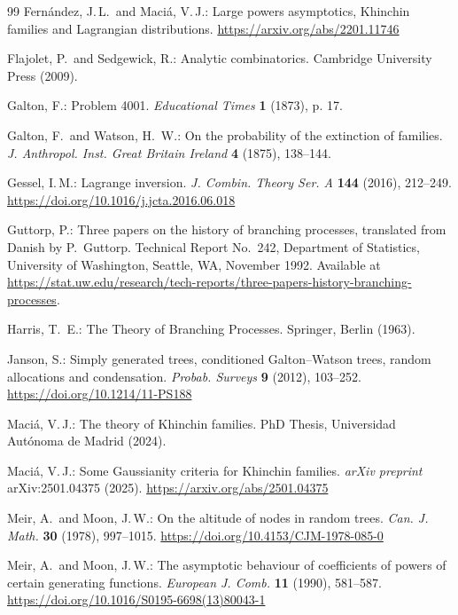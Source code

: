\documentclass[11pt,a4paper,leqno]{amsart}
\theoremstyle{plain}
\theoremstyle{definition}
\numberwithin{equation}{section}
\begin{document}
\begin{thebibliography}{99}
		Fernández, J.\,L.\ and Maciá, V.\,J.: 
		Large powers asymptotics, Khinchin families and Lagrangian distributions.  
		\url{https://arxiv.org/abs/2201.11746}
		
		Flajolet, P.\ and Sedgewick, R.: 
		Analytic combinatorics.  
		Cambridge University Press (2009).
		
		Galton, F.:  
		Problem 4001.  
		\emph{Educational Times} \textbf{1} (1873), p. 17.
		
		Galton, F.\ and Watson, H.~W.: 
		On the probability of the extinction of families.  
		\emph{J. Anthropol. Inst. Great Britain Ireland} \textbf{4} (1875), 138–144.
		
		Gessel, I.\,M.: 
		Lagrange inversion.  
		\emph{J. Combin. Theory Ser. A} \textbf{144} (2016), 212–249.  
		\url{https://doi.org/10.1016/j.jcta.2016.06.018}
		
		Guttorp, P.: 
		Three papers on the history of branching processes, translated from Danish by P.~Guttorp.  
		Technical Report No.~242, Department of Statistics, University of Washington, Seattle, WA, November 1992.  
		Available at \url{https://stat.uw.edu/research/tech-reports/three-papers-history-branching-processes}.  
		
		Harris, T.~E.:  
		The Theory of Branching Processes.  
		Springer, Berlin (1963).  
		
		Janson, S.: 
		Simply generated trees, conditioned Galton–Watson trees, random allocations and condensation.  
		\emph{Probab. Surveys} \textbf{9} (2012), 103–252.  
		\url{https://doi.org/10.1214/11-PS188}
		
		Maciá, V.\,J.: 
		The theory of Khinchin families.  
		PhD Thesis, Universidad Autónoma de Madrid (2024).
		
		Maciá, V.\,J.: 
		Some Gaussianity criteria for Khinchin families.  
		\emph{arXiv preprint} arXiv:2501.04375 (2025).  
		\url{https://arxiv.org/abs/2501.04375}
		
		Meir, A.\ and Moon, J.\,W.: 
		On the altitude of nodes in random trees.  
		\emph{Can. J. Math.} \textbf{30} (1978), 997–1015.  
		\url{https://doi.org/10.4153/CJM-1978-085-0}
		
		Meir, A.\ and Moon, J.\,W.: 
		The asymptotic behaviour of coefficients of powers of certain generating functions.  
		\emph{European J. Comb.} \textbf{11} (1990), 581–587.  
		\url{https://doi.org/10.1016/S0195-6698(13)80043-1}
		

\end{thebibliography}
\end{document}
